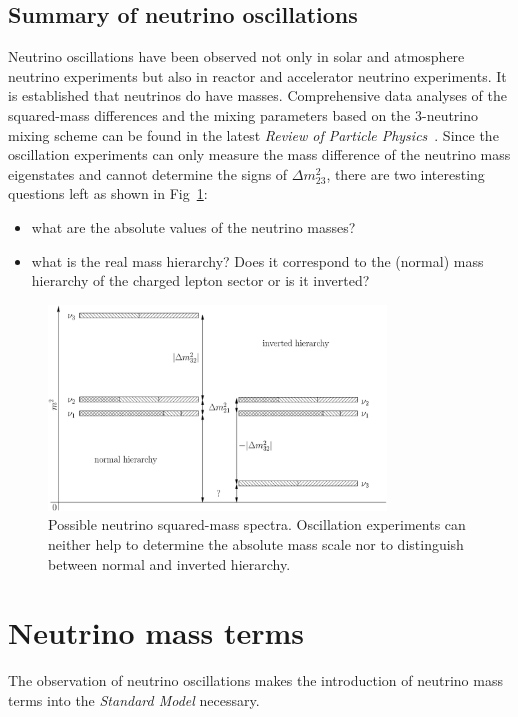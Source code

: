 \subsection{Summary of neutrino oscillations}
\label{sec:allo}
Neutrino oscillations have been observed not only in solar and atmosphere neutrino experiments but also in reactor and accelerator neutrino experiments. It is established that neutrinos do have masses. Comprehensive data analyses of the squared-mass differences and the mixing parameters based on the 3-neutrino mixing scheme can be found in the latest \emph{Review of Particle Physics}~\cite{PDG07}. Since the oscillation experiments can only measure the mass difference of the neutrino mass eigenstates and cannot determine the signs of $\Delta m^{2}_{23}$, there are two interesting questions left as shown in Fig~\ref{fig:hie}:
\begin{itemize}
\item what are the absolute values of the neutrino masses?
\item what is the real mass hierarchy? Does it correspond to the   (normal) mass hierarchy of the charged lepton sector or is it   inverted?
\end{itemize}
\begin{figure}[tbhp]
  \centering
  \includegraphics[width=0.8\textwidth]{massHierarchy.eps}  
  \caption{Possible neutrino squared-mass spectra. Oscillation     experiments can neither help to determine the absolute mass scale     nor to distinguish between normal and inverted hierarchy.}
  \label{fig:hie}
\end{figure}


\section{Neutrino mass terms}
\label{sec:nema}
The observation of neutrino oscillations makes the introduction of
neutrino mass terms into the \emph{Standard Model} necessary.
